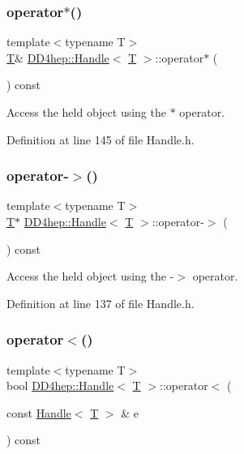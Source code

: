 \subsubsection{\texorpdfstring{operator$\ast$()}{operator*()}}
{\footnotesize\ttfamily template$<$typename T$>$ \\
\hyperlink{class_t}{T}\& \hyperlink{class_d_d4hep_1_1_handle}{D\+D4hep\+::\+Handle}$<$ \hyperlink{class_t}{T} $>$\+::operator$\ast$ (\begin{DoxyParamCaption}{ }\end{DoxyParamCaption}) const\hspace{0.3cm}{\ttfamily [inline]}}



Access the held object using the $\ast$ operator. 



Definition at line 145 of file Handle.\+h.

\hypertarget{class_d_d4hep_1_1_handle_aa29c5d0668d78066a3ac9c07f08755b4}{}\label{class_d_d4hep_1_1_handle_aa29c5d0668d78066a3ac9c07f08755b4} 
\subsubsection{\texorpdfstring{operator-\/$>$()}{operator->()}}
{\footnotesize\ttfamily template$<$typename T$>$ \\
\hyperlink{class_t}{T}$\ast$ \hyperlink{class_d_d4hep_1_1_handle}{D\+D4hep\+::\+Handle}$<$ \hyperlink{class_t}{T} $>$\+::operator-\/$>$ (\begin{DoxyParamCaption}{ }\end{DoxyParamCaption}) const\hspace{0.3cm}{\ttfamily [inline]}}



Access the held object using the -\/$>$ operator. 



Definition at line 137 of file Handle.\+h.

\hypertarget{class_d_d4hep_1_1_handle_ac227419a25e6f15743393bbbeb9b8d94}{}\label{class_d_d4hep_1_1_handle_ac227419a25e6f15743393bbbeb9b8d94} 
\subsubsection{\texorpdfstring{operator$<$()}{operator<()}}
{\footnotesize\ttfamily template$<$typename T$>$ \\
bool \hyperlink{class_d_d4hep_1_1_handle}{D\+D4hep\+::\+Handle}$<$ \hyperlink{class_t}{T} $>$\+::operator$<$ (\begin{DoxyParamCaption}\item[{const \hyperlink{class_d_d4hep_1_1_handle}{Handle}$<$ \hyperlink{class_t}{T} $>$ \&}]{e }\end{DoxyParamCaption}) const\hspace{0.3cm}{\ttfamily [inline]}}




